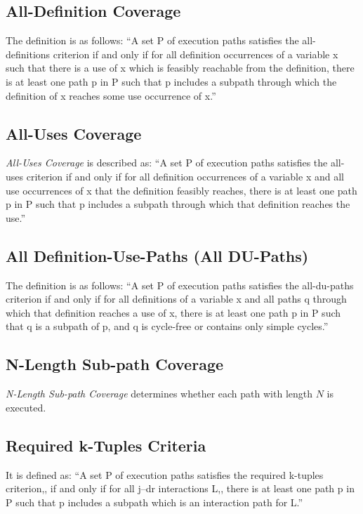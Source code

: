 \documentclass[12pt,a4paper]{report}
\begin{document}
\subsection{All-Definition Coverage}
The definition is as follows:
“A set P of execution paths satisfies the all-definitions criterion if and only if for all definition occurrences of a variable x such that there is a use of x which is feasibly reachable from the definition, there is at least one path p in P such that p includes a subpath through which the definition of x reaches some use occurrence of x.”\cite{Zhu:1997:SUT:267580.267590}

\subsection{All-Uses Coverage}
\emph{All-Uses Coverage} is described as:
“A set P of execution paths satisfies the all-uses criterion if and only if for all definition occurrences of a variable x and all use occurrences of x that the definition feasibly reaches, there is at least one path p in P such that p includes a subpath through which that definition reaches the use.”
\cite{Zhu:1997:SUT:267580.267590}

\subsection{All Definition-Use-Paths (All DU-Paths)}
The definition is as follows:
“A set P of execution paths satisfies the all-du-paths criterion if and only if for all definitions of a variable x and all paths q through which that definition reaches a use of x, there is at least one path p in P such that q is a subpath of p, and q is cycle-free or contains only simple cycles.”
\cite{Zhu:1997:SUT:267580.267590}

\subsection{N-Length Sub-path Coverage}
\emph{N-Length Sub-path Coverage} determines whether each path with length $N$ is executed.

\subsection{Required k-Tuples Criteria}
It is defined as:
“A set P of execution paths satisfies the required k-tuples criterion,, if and only if for all j–dr interactions L,, there is at least one path p in P such
 that p includes a subpath which is an interaction path for L.”\cite{Zhu:1997:SUT:267580.267590}
\end{document}
